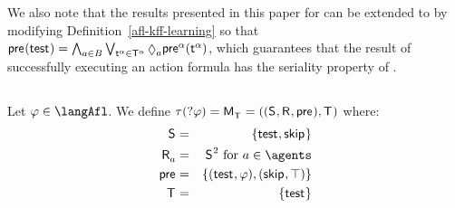 We also note that the results presented in this paper for \classKFF{} can be extended to \classKD{} by modifying Definition~\ref{afl-kff-learning} so that $\aPrecondition(\aStateTest) = \bigwedge_{\agentA \in \agentsB} \bigvee_{\aStateT[\alpha] \in \aStatesT[\alpha]} \possible[\agentA] \aPrecondition[\alpha](\aStateT[\alpha])$, which guarantees that the result of successfully executing an action formula has the seriality property of \classKD{}.

\subsection{\classS{}}

\begin{definition}[Test]\label{afl-s-test}
    Let $\phi \in \langAfl$. 
    We define $\tau(\test{\phi}) = \aPModel{\aStatesT} = \aPModelTuple{\aStatesT}$ where:
    \begin{eqnarray*}
        \aStates &=& \{\aStateTest, \aStateSkip\}\\
        \aAccessibility{\agentA} &=& \aStates^2 \text{ for } \agentA \in \agents\\
        \aPrecondition &=& \{(\aStateTest, \phi), (\aStateSkip, \top)\}\\
        \aStatesT &=& \{\aStateTest\}
    \end{eqnarray*}
\end{definition}

